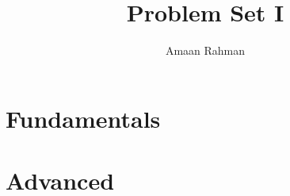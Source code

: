 \documentclass[12pt]{article}
\title{Problem Set I}
\author{Amaan Rahman}
\begin{document}
\maketitle
\section*{Fundamentals}

\section*{Advanced}

\end{document}
